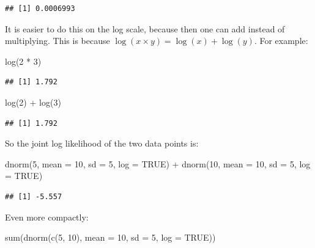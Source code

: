 \documentclass[
  12pt,
]{krantz}
\newenvironment{Shaded}{\begin{snugshade}}{\end{snugshade}}
\newcommand{\AttributeTok}[1]{\textcolor[rgb]{0.77,0.63,0.00}{#1}}
\newcommand{\ConstantTok}[1]{\textcolor[rgb]{0.00,0.00,0.00}{#1}}
\newcommand{\DecValTok}[1]{\textcolor[rgb]{0.00,0.00,0.81}{#1}}
\newcommand{\FunctionTok}[1]{\textcolor[rgb]{0.00,0.00,0.00}{#1}}
\newcommand{\NormalTok}[1]{#1}
\newcommand{\SpecialCharTok}[1]{\textcolor[rgb]{0.00,0.00,0.00}{#1}}
\theoremstyle{definition}
\theoremstyle{definition}
\theoremstyle{definition}
\theoremstyle{definition}
\theoremstyle{remark}
\begin{document}
\begin{verbatim}
## [1] 0.0006993
\end{verbatim}

It is easier to do this on the log scale, because then one can add instead of multiplying. This is because \(\log(x\times y)= \log(x) + \log(y)\). For example:

\begin{Shaded}
\begin{Highlighting}[]
\FunctionTok{log}\NormalTok{(}\DecValTok{2} \SpecialCharTok{*} \DecValTok{3}\NormalTok{)}
\end{Highlighting}
\end{Shaded}

\begin{verbatim}
## [1] 1.792
\end{verbatim}

\begin{Shaded}
\begin{Highlighting}[]
\FunctionTok{log}\NormalTok{(}\DecValTok{2}\NormalTok{) }\SpecialCharTok{+} \FunctionTok{log}\NormalTok{(}\DecValTok{3}\NormalTok{)}
\end{Highlighting}
\end{Shaded}

\begin{verbatim}
## [1] 1.792
\end{verbatim}

So the joint log likelihood of the two data points is:

\begin{Shaded}
\begin{Highlighting}[]
\FunctionTok{dnorm}\NormalTok{(}\DecValTok{5}\NormalTok{, }\AttributeTok{mean =} \DecValTok{10}\NormalTok{, }\AttributeTok{sd =} \DecValTok{5}\NormalTok{, }\AttributeTok{log =} \ConstantTok{TRUE}\NormalTok{) }\SpecialCharTok{+}
  \FunctionTok{dnorm}\NormalTok{(}\DecValTok{10}\NormalTok{, }\AttributeTok{mean =} \DecValTok{10}\NormalTok{, }\AttributeTok{sd =} \DecValTok{5}\NormalTok{, }\AttributeTok{log =} \ConstantTok{TRUE}\NormalTok{)}
\end{Highlighting}
\end{Shaded}

\begin{verbatim}
## [1] -5.557
\end{verbatim}

Even more compactly:

\begin{Shaded}
\begin{Highlighting}[]
\FunctionTok{sum}\NormalTok{(}\FunctionTok{dnorm}\NormalTok{(}\FunctionTok{c}\NormalTok{(}\DecValTok{5}\NormalTok{, }\DecValTok{10}\NormalTok{), }\AttributeTok{mean =} \DecValTok{10}\NormalTok{, }\AttributeTok{sd =} \DecValTok{5}\NormalTok{, }\AttributeTok{log =} \ConstantTok{TRUE}\NormalTok{))}
\end{Highlighting}
\end{Shaded}
\end{document}
